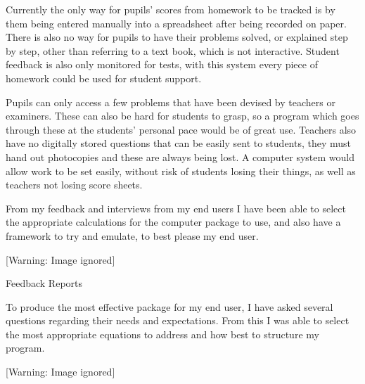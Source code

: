\documentclass{article}
\begin{document}
Currently the only way for pupils' scores from homework to be tracked is by them being entered manually into a spreadsheet after being recorded on paper. There is also no way for pupils to have their problems solved, or explained step by step, other than referring to a text book, which is not interactive. Student feedback is also only monitored for tests, with this system every piece of homework could be used for student support.

Pupils can only access a few problems that have been devised by teachers or examiners. These can also be hard for students to grasp, so a program which goes through these at the students' personal pace would be of great use. Teachers also have no digitally stored questions that can be easily sent to students, they must hand out photocopies and these are always being lost. A computer system would allow work to be set easily, without risk of students losing their things, as well as teachers not losing score sheets.

From my feedback and interviews from my end users I have been able to select the appropriate calculations for the computer package to use, and also have a framework to try and emulate, to best please my end user.


\bigskip



\begin{center}
 [Warning: Image ignored] %

\end{center}
Feedback Reports


\bigskip

To produce the most effective package for my end user, I have asked several questions regarding their needs and expectations. From this I was able to select the most appropriate equations to address and how best to structure my program.


\bigskip


\bigskip



\begin{center}
 [Warning: Image ignored] %

\end{center}

\bigskip
\end{document}
